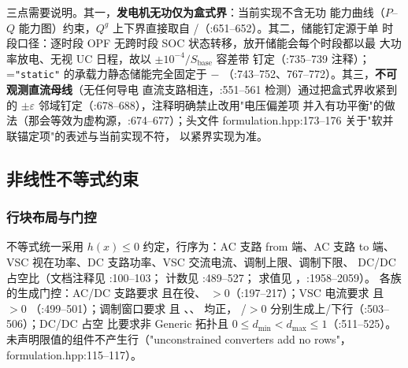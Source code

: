 三点需要说明。其一，\textbf{发电机无功仅为盒式界}：当前实现不含无功
能力曲线（$P$--$Q$ 能力图）约束，$Q^g$ 上下界直接取自
/（:651--652）。其二，储能钉定源于单
时段口径：逐时段 OPF 无跨时段 SOC 状态转移，放开储能会每个时段都以最
大功率放电、无视 UC 日程，故以 $\pm 10^{-4}/S_{\mathrm{base}}$ 容差带
钉定（:735--739 注释）；=\texttt{"static"}
的承载力静态储能完全固定于 $-$
（:743--752、767--772）。其三，\textbf{不可观测直流母线}（无任何导电
直流支路相连，:551--561 检测）通过把盒式界收紧到  的
$\pm\varepsilon$ 邻域钉定（:678--688），注释明确禁止改用"电压偏差项
并入有功平衡"的做法（那会等效为虚构源，:674--677）；头文件
formulation.hpp:173--176 关于"软并联锚定项"的表述与当前实现不符，
以紧界实现为准。

\subsection{非线性不等式约束}

\subsubsection*{行块布局与门控}
不等式统一采用 $h(x)\le 0$ 约定，行序为：AC 支路 from 端、AC 支路 to
端、VSC 视在功率、DC 支路功率、VSC 交流电流、调制上限、调制下限、
DC/DC 占空比（文档注释见
:100--103；
计数见 :489--527；
求值见 ，:1958--2059）。
各族的生成门控：AC/DC 支路要求  且在役、
$>0$（:197--217）；VSC 电流要求
 且 $>0$
（:499--501）；调制窗口要求
 且
、、 均正，
/$>0$ 分别生成上/下行（:503--506）；DC/DC 占空
比要求非 Generic 拓扑且 $0\le d_{\min}<d_{\max}\le 1$（:511--525）。
未声明限值的组件不产生行（"unconstrained converters add no rows"，
formulation.hpp:115--117）。

